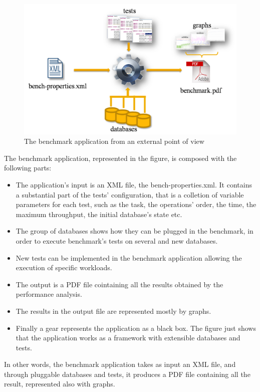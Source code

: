 \begin{figure}[htp!] 
	\begin{center}
		\includegraphics[width=13cm]{img/diagramma-specifiche.png}	
	\end{center}
	\caption{The benchmark application from an external point of view}
	\label{system-external-view}	
\end{figure}

The benchmark application, represented in the figure, is composed with the following parts:
\begin{itemize}
	\item The application's input is an XML file, the bench-properties.xml. It contains a substantial part of the tests' configuration, that is a colletion of variable parameters for each test, such as the task, the operations' order, the time, the maximum throughput, the initial database's state etc.
	\item The group of databases shows how they can be plugged in the benchmark, in order to execute benchmark's tests on several and new databases.
	\item New tests can be implemented in the benchmark application allowing the execution of specific workloads. 
	\item The output is a PDF file cointaining all the results obtained by the performance analysis.
	\item The results in the output file are represented mostly by graphs.
	\item Finally a gear represents the application as a black box. The figure just shows that the application works as a framework with extensible databases and tests.
\end{itemize}
In other words, the benchmark application takes as input an XML file, and through pluggable databases and tests, it produces a PDF file containing all the result, represented also with graphs.
	
